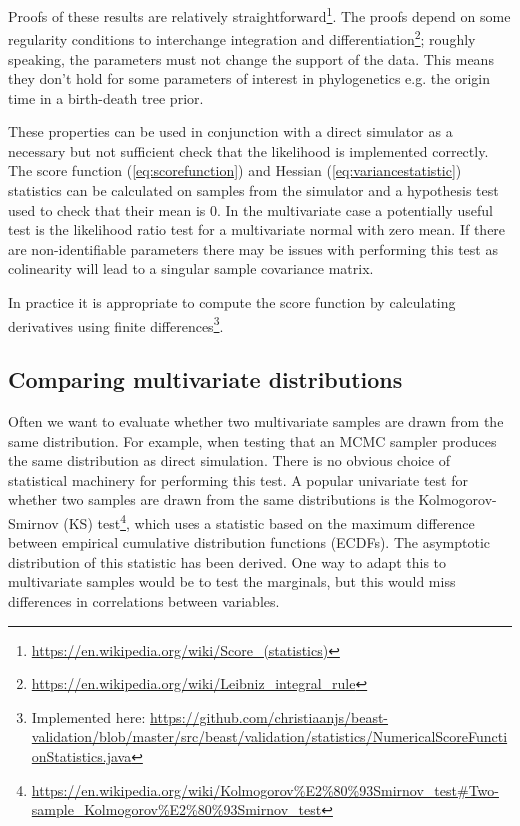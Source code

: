 \documentclass[oneside]{article}
\begin{document}
Proofs of these results are relatively straightforward\footnote{\url{https://en.wikipedia.org/wiki/Score_(statistics)}}. The proofs depend on some regularity conditions to interchange integration and differentiation\footnote{\url{https://en.wikipedia.org/wiki/Leibniz_integral_rule}}; roughly speaking, the parameters must not change the support of the data. This means they don't hold for some parameters of interest in phylogenetics e.g. the origin time in a birth-death tree prior.

These properties can be used in conjunction with a direct simulator as a necessary but not sufficient check that the likelihood is implemented correctly. The score function (\ref{eq:scorefunction}) and Hessian (\ref{eq:variancestatistic}) statistics can be calculated on samples from the simulator and a hypothesis test used to check that their mean is 0. In the multivariate case a potentially useful test is the likelihood ratio test for a multivariate normal with zero mean. If there are non-identifiable parameters there may be issues with performing this test as colinearity will lead to a singular sample covariance matrix.

In practice it is appropriate to compute the score function by calculating derivatives using finite differences\footnote{Implemented here: \url{https://github.com/christiaanjs/beast-validation/blob/master/src/beast/validation/statistics/NumericalScoreFunctionStatistics.java}}.

\subsection{Comparing multivariate distributions}

Often we want to evaluate whether two multivariate samples are drawn from the same distribution. For example, when testing that an MCMC sampler produces the same distribution as direct simulation. There is no obvious choice of statistical machinery for performing this test. A popular univariate test for whether two samples are drawn from the same distributions is the Kolmogorov-Smirnov (KS) test\footnote{\url{https://en.wikipedia.org/wiki/Kolmogorov\%E2\%80\%93Smirnov_test\#Two-sample_Kolmogorov\%E2\%80\%93Smirnov_test}}, which uses a statistic based on the maximum difference between empirical cumulative distribution functions (ECDFs). The asymptotic distribution of this statistic has been derived. One way to adapt this to multivariate samples would be to test the marginals, but this would miss differences in correlations between variables.
\end{document}

